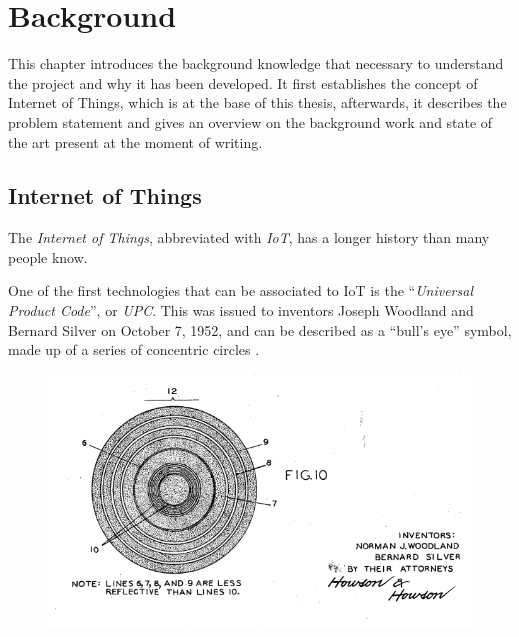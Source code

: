 
\chapter{Background}\label{chapter:background}

This chapter introduces the background knowledge that necessary to understand the project and why it has been developed.
It first establishes the concept of Internet of Things, which is at the base of this thesis, afterwards, it describes the problem statement and gives an overview on the background work and state of the art present at the moment of writing.


\section{Internet of Things}

The \textit{Internet of Things}, abbreviated with \textit{IoT}, has a longer history than many people know.


One of the first technologies that can be associated to IoT is the ``\textit{Universal Product Code}'', or \textit{UPC}.
This was issued to inventors Joseph Woodland and Bernard Silver on October 7, 1952, and can be described as a ``bull's eye'' symbol, made up of a series of concentric circles \cite{upc_patent}. 

\begin{figure}
	\centering
	\includegraphics[width=\textwidth-3cm]{resources/img/upc_1}
	\caption{}
\end{figure}

